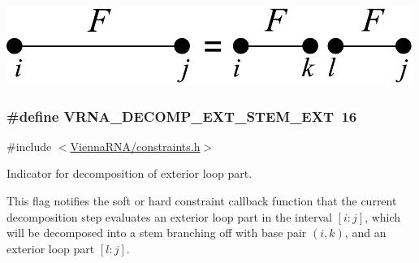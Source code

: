  
\begin{DoxyImageNoCaption}
  \mbox{\includegraphics[width=\textwidth,height=\textheight/2,keepaspectratio=true]{decomp_ext_ext_ext}}
\end{DoxyImageNoCaption}
 \hypertarget{group__constraints_gabb09c5b78b75a44502fc77b950125c1e}{}
\subsubsection[{V\+R\+N\+A\+\_\+\+D\+E\+C\+O\+M\+P\+\_\+\+E\+X\+T\+\_\+\+S\+T\+E\+M\+\_\+\+E\+X\+T}]{\setlength{\rightskip}{0pt plus 5cm}\#define V\+R\+N\+A\+\_\+\+D\+E\+C\+O\+M\+P\+\_\+\+E\+X\+T\+\_\+\+S\+T\+E\+M\+\_\+\+E\+X\+T~16}\label{group__constraints_gabb09c5b78b75a44502fc77b950125c1e}


{\ttfamily \#include $<$\hyperlink{constraints_8h}{Vienna\+R\+N\+A/constraints.\+h}$>$}



Indicator for decomposition of exterior loop part. 

This flag notifies the soft or hard constraint callback function that the current decomposition step evaluates an exterior loop part in the interval $[i:j]$, which will be decomposed into a stem branching off with base pair $(i,k)$, and an exterior loop part $[l:j]$.

